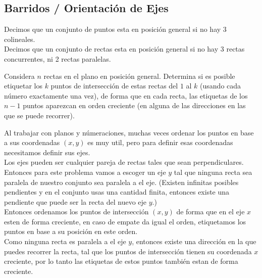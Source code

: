 \documentclass[11pt]{scrartcl}
\begin{document}
\subsection{Barridos / Orientación de Ejes }

\begin{definition}
    Decimos que un conjunto de puntos esta en posición general si no hay 3 colineales. \\
    Decimos que un conjunto de rectas esta en posición general si no hay 3 rectas concurrentes, ni 2 rectas paralelas.
\end{definition}

\begin{example}
    Considera $n$ rectas en el plano en posición general. Determina si es posible etiquetar los $k$ puntos de intersección de estas rectas del $1$ al $k$ (usando cada número exactamente una vez), de forma que en cada recta, las etiquetas de los $n-1$ puntos aparezcan en orden creciente (en alguna de las direcciones en las que se puede recorrer). 
\end{example}

\begin{soln}
    Al trabajar con planos y númeraciones, muchas veces ordenar los puntos en base a sus coordenadas $(x,y)$ es muy util, pero para definir esas coordenadas necesitamos definir sus ejes. \\
    Los ejes pueden ser cualquier pareja de rectas tales que sean perpendiculares. \\

        Entonces para este problema vamos a escoger un eje $y$ tal que ninguna recta sea paralela de nuestro conjunto sea paralela a el eje. (Existen infinitas posibles pendientes y en el conjunto usas una cantidad finita, entonces existe una pendiente que puede ser la recta del nuevo eje $y$.) \\
        Entonces ordenamos los puntos de intersección $(x,y)$ de forma que en el eje $x$ esten de forma creciente, en caso de empate da igual el orden, etiquetamos los puntos en base a su posición en este orden. \\
        Como ninguna recta es paralela a el eje $y$, entonces existe una dirección en la que puedes recorrer la recta, tal que los puntos de intersección tienen su coordenada $x$ creciente, por lo tanto las etiquetas de estos puntos también estan de forma creciente. 
\end{soln}
\end{document}
